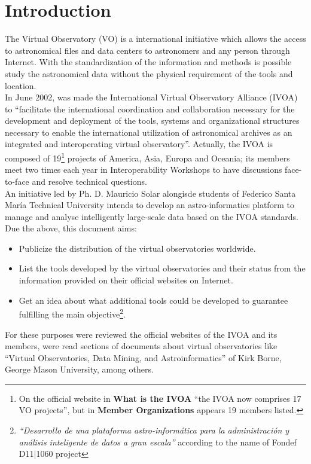 \section{Introduction}
The Virtual Observatory (VO) is a international initiative which allows the
access to astronomical files and data centers to astronomers and any person
through Internet. With the standardization of the information and methods is
possible study the astronomical data without the physical requirement of the
tools and location.\\

In June 2002, was made the International Virtual Observatory Alliance (IVOA) to
``facilitate the international coordination and collaboration necessary for the
development and deployment of the tools, systems and organizational structures
necessary to enable the international utilization of astronomical archives as an
integrated and interoperating virtual observatory''.  Actually, the IVOA is
composed of 19\footnote{On the official website in \textbf{What is the IVOA}
``the IVOA now comprises 17 VO projects'', but in \textbf{Member Organizations}
appears 19 members listed.} projects of America, Asia, Europa and Oceania; its
members meet two times each year in Interoperability  Workshops to have
discussions face-to-face and resolve technical questions.\\

An initiative led by Ph. D. Mauricio Solar alongisde students of Federico Santa
Mar\'{i}a Technical University intends to develop an astro-informatics platform
to manage and analyse intelligently large-scale data based on the IVOA
standards. Due the above, this document aims:

\begin{itemize}
	\item Publicize the distribution of the virtual observatories worldwide.
    \item List the tools developed by the virtual observatories and their status
from the information provided on their official websites on Internet.
    \item Get an idea about what additional tools could be developed to
guarantee fulfilling the main objective\footnote{\textit{``Desarrollo de una
plataforma astro-inform\'{a}tica para la administraci\'{o}n y an\'{a}lisis
inteligente de datos a gran escala''} according to the name of Fondef D11$
\vert $1060 project}.
\end{itemize}

For these purposes were reviewed the official websites of the IVOA and its
members, were read sections of documents about virtual observatories like
``Virtual Observatories, Data Mining, and Astroinformatics'' of Kirk Borne,
George Mason University, among others.\\
